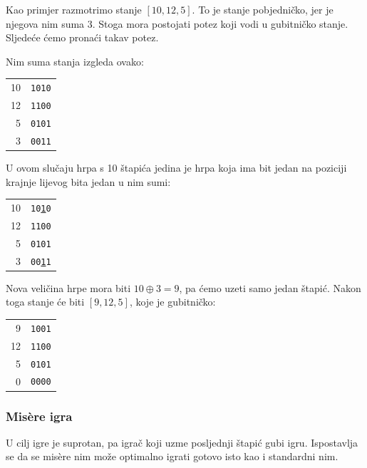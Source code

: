 Kao primjer razmotrimo stanje $[10,12,5]$.
To je stanje pobjedničko,
jer je njegova nim suma 3.
Stoga mora postojati potez koji
vodi u gubitničko stanje.
Sljedeće ćemo pronaći takav potez.

Nim suma stanja izgleda ovako:

\begin{center}
\begin{tabular}{r|r}
10 & \texttt{1010} \\
12 & \texttt{1100} \\
5 & \texttt{0101} \\
\hline
3 & \texttt{0011} \\
\end{tabular}
\end{center}

U ovom slučaju hrpa s 10 štapića
jedina je hrpa koja ima bit jedan
na poziciji krajnje lijevog
bita jedan u nim sumi:

\begin{center}
\begin{tabular}{r|r}
10 & \texttt{10\underline{1}0} \\
12 & \texttt{1100} \\
5 & \texttt{0101} \\
\hline
3 & \texttt{00\underline{1}1} \\
\end{tabular}
\end{center}

Nova veličina hrpe mora biti
$10 \oplus 3 = 9$,
pa ćemo uzeti samo jedan štapić.
Nakon toga stanje će biti $[9,12,5]$,
koje je gubitničko:

\begin{center}
\begin{tabular}{r|r}
9 & \texttt{1001} \\
12 & \texttt{1100} \\
5 & \texttt{0101} \\
\hline
0 & \texttt{0000} \\
\end{tabular}
\end{center}

\subsubsection{Misère igra}


U  cilj igre
je suprotan,
pa igrač koji uzme posljednji štapić
gubi igru.
Ispostavlja se da se misère nim može
optimalno igrati gotovo isto kao i standardni nim.

